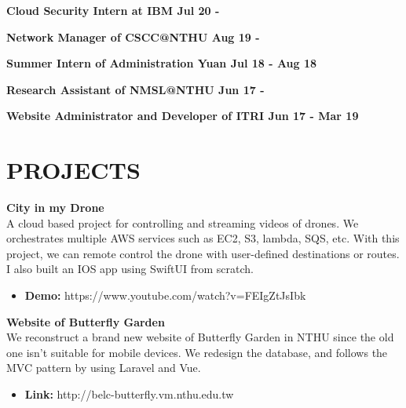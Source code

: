\documentclass[margin]{res}
\begin{document}
\begin{resume}
\textbf{Cloud Security Intern at IBM \hfill{Jul 20 -}\\}

\textbf{Network Manager of CSCC@NTHU \hfill{Aug 19 - }\\}

\textbf{Summer Intern of Administration Yuan \hfill{Jul 18 - Aug 18}\\}

\textbf{Research Assistant of NMSL@NTHU \hfill{Jun 17 - }\\}

\textbf{Website Administrator and Developer of ITRI \hfill{Jun 17 - Mar 19}\\}

\section{PROJECTS}

\textbf{City in my Drone}\\
A cloud based project for controlling and streaming videos of drones. We orchestrates multiple AWS services such as EC2, S3, lambda, SQS, etc. With this project, we can remote control the drone with user-defined destinations or routes. I also built an IOS app using SwiftUI from scratch.
\\
\begin{itemize}
    \item \textbf{Demo:} https://www.youtube.com/watch?v=FEIgZtJsIbk
\end{itemize}

\textbf{Website of Butterfly Garden}\\
We reconstruct a brand new website of Butterfly Garden in NTHU since the old one isn't suitable for mobile devices. We redesign the database, and follows the MVC pattern by using Laravel and Vue.
\\
\begin{itemize}
    \item \textbf{Link:} http://belc-butterfly.vm.nthu.edu.tw
\end{itemize}


\end{resume}
\end{document}
